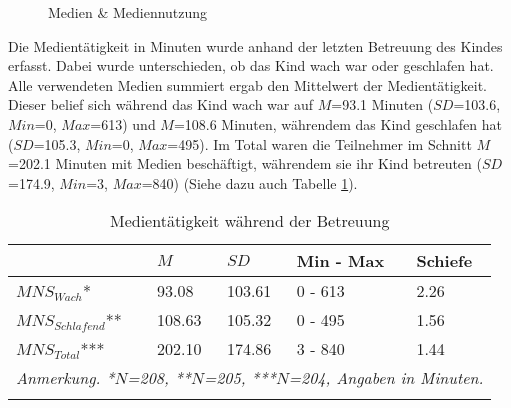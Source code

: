 \begin{figure}[htp]
\caption{Medien \& Mediennutzung}\label{fig:MedienMediennutzung}
\centering
{}
\end{figure}

Die Medientätigkeit in Minuten wurde anhand der letzten Betreuung des Kindes erfasst. Dabei wurde unterschieden, ob das Kind wach war oder geschlafen hat. Alle verwendeten Medien summiert ergab den Mittelwert der Medientätigkeit. Dieser belief sich während das Kind wach war auf $M$=93.1 Minuten ($SD$=103.6, $Min$=0, $Max$=613) und $M$=108.6 Minuten, währendem das Kind geschlafen hat ($SD$=105.3, $Min$=0, $Max$=495). Im Total waren die Teilnehmer im Schnitt $M$=202.1 Minuten mit Medien beschäftigt, währendem sie ihr Kind betreuten ($SD$=174.9, $Min$=3, $Max$=840) (Siehe dazu auch Tabelle \ref{table:Medientätigkeit}).

\begin{table}%
\begin{tabular}{m{8em} m{4em}  m{4em}  m{5em} m{4em}} 
  \hline
  & $M$ & $SD$ & Min - Max & Schiefe\\
  \hline
  $MNS_{Wach}$* & 93.08 & 103.61 & 0 - 613 & 2.26\\
  $MNS_{Schlafend}$** & 108.63 & 105.32 & 0 - 495 & 1.56\\
  $MNS_{Total}$*** & 202.10 & 174.86 & 3 - 840 & 1.44 \\
  \hline
  \multicolumn{5}{l}{\textit{Anmerkung. *$N$=208, **$N$=205, ***$N$=204, Angaben in Minuten.}}\\
  &&&&\\
\end{tabular}
\caption{Medientätigkeit während der Betreuung}
\label{table:Medientätigkeit}
\end{table}


